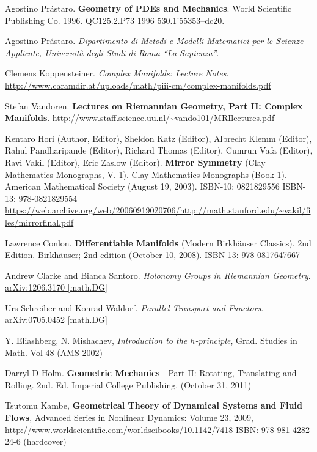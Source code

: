 Agostino Pr\'{a}staro.  \textbf{Geometry of PDEs and Mechanics}.  World Scientific Publishing Co.  1996.  QC125.2.P73 1996  530.1'55353--dc20.  

Agostino Pr\'{a}staro.  \emph{Dipartimento di Metodi e Modelli Matematici per le Scienze Applicate, Universit\`{a} degli Studi di Roma ``La Sapienza''}.  

  Clemens Koppensteiner.  \emph{Complex Manifolds: Lecture Notes}.  \url{http://www.caramdir.at/uploads/math/piii-cm/complex-manifolds.pdf}
  

Stefan Vandoren. \textbf{Lectures on Riemannian Geometry, Part II: Complex Manifolds}.  \url{http://www.staff.science.uu.nl/~vando101/MRIlectures.pdf} 

Kentaro Hori (Author, Editor), Sheldon Katz (Editor), Albrecht Klemm (Editor), Rahul Pandharipande (Editor), Richard Thomas (Editor), Cumrun Vafa (Editor), Ravi Vakil (Editor), Eric Zaslow (Editor).  \textbf{Mirror Symmetry} (Clay Mathematics Monographs, V. 1).  Clay Mathematics Monographs (Book 1).  American Mathematical Society (August 19, 2003).  ISBN-10: 0821829556  ISBN-13: 978-0821829554  \url{https://web.archive.org/web/20060919020706/http://math.stanford.edu/~vakil/files/mirrorfinal.pdf}

Lawrence Conlon.  \textbf{Differentiable Manifolds} (Modern Birkhäuser Classics).  2nd Edition.  Birkhäuser; 2nd edition (October 10, 2008).  ISBN-13: 978-0817647667




Andrew Clarke and Bianca Santoro.  \emph{Holonomy Groups in Riemannian Geometry}.  \href{https://arxiv.org/pdf/1206.3170.pdf}{arXiv:1206.3170 [math.DG]}

Urs Schreiber and Konrad Waldorf.  \emph{Parallel Transport and Functors}.  \href{https://arxiv.org/pdf/0705.0452.pdf}{arXiv:0705.0452 [math.DG]}

Y. Eliashberg, N. Mishachev, \emph{Introduction to the $h$-principle}, Grad. Studies in Math. Vol 48 (AMS 2002)

Darryl D Holm. \textbf{Geometric Mechanics} - Part II: Rotating, Translating and Rolling. 2nd. Ed. Imperial College Publishing. (October 31, 2011) 

Tsutomu Kambe, \textbf{Geometrical Theory of Dynamical Systems and Fluid Flows}, Advanced Series in Nonlinear Dynamics: Volume 23, 2009, \url{http://www.worldscientific.com/worldscibooks/10.1142/7418} ISBN: 978-981-4282-24-6 (hardcover)

